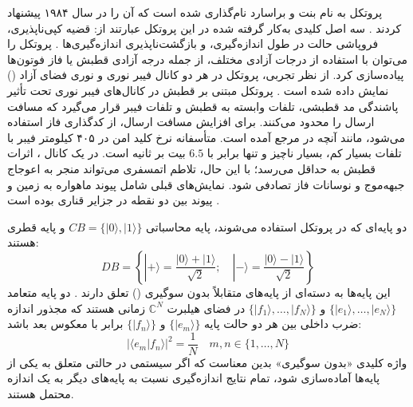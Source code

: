 پروتکل  به نام بنت و براسارد نام‌گذاری شده است که آن را در سال ۱۹۸۴ پیشنهاد کردند \cite{15,16}. سه اصل کلیدی به‌کار گرفته شده در این پروتکل عبارتند از: قضیه کپی‌ناپذیری، فروپاشی حالت در طول اندازه‌گیری، و بازگشت‌ناپذیری اندازه‌گیری‌ها \cite{7}. پروتکل  را می‌توان با استفاده از درجات آزادی مختلف، از جمله درجه آزادی قطبش \cite{25} یا فاز فوتون‌ها \cite{22} پیاده‌سازی کرد. از نظر تجربی، پروتکل  در هر دو کانال فیبر نوری و نوری فضای آزاد () نمایش داده شده است \cite{25,26}. پروتکل  مبتنی بر قطبش در کانال‌های فیبر نوری تحت تأثیر پاشندگی مد قطبشی، تلفات وابسته به قطبش و تلفات فیبر قرار می‌گیرد که مسافت ارسال را محدود می‌کنند. برای افزایش مسافت ارسال، از کدگذاری فاز استفاده می‌شود، مانند آنچه در مرجع \cite{26} آمده است. متأسفانه نرخ کلید امن در ۴۰۵ کیلومتر فیبر با تلفات بسیار کم، بسیار ناچیز و تنها برابر با $6.5$ بیت بر ثانیه است. در یک کانال ، اثرات قطبش به حداقل می‌رسد؛ با این حال، تلاطم اتمسفری می‌تواند منجر به اعوجاج جبهه‌موج و نوسانات فاز تصادفی شود. نمایش‌های قبلی  شامل پیوند  ماهواره به زمین و پیوند  بین دو نقطه در جزایر قناری بوده است \cite{25}.

دو پایه‌ای که در پروتکل  استفاده می‌شوند، پایه محاسباتی $CB = \{|0\rangle, |1\rangle\}$ و پایه قطری هستند:
\begin{equation}
	DB = \left\{ |+\rangle = \frac{|0\rangle + |1\rangle}{\sqrt{2}} ; \quad |-\rangle = \frac{|0\rangle - |1\rangle}{\sqrt{2}} \right\}
	\label{eq:6-7}
\end{equation}
این پایه‌ها به دسته‌ای از پایه‌های متقابلاً بدون سوگیری () تعلق دارند \cite{27,28,29,30,31}. دو پایه متعامد $\{|e_1\rangle, \dots, |e_N\rangle\}$ و $\{|f_1\rangle, \dots, |f_N\rangle\}$ در فضای هیلبرت $\mathbb{C}^N$ زمانی  هستند که مجذور اندازه ضرب داخلی بین هر دو حالت پایه $\{|e_m\rangle\}$ و $\{|f_n\rangle\}$ برابر با معکوس بعد باشد:
\begin{equation}
	|\langle e_m | f_n \rangle|^2 = \frac{1}{N} \quad m, n \in \{1, \dots, N\}
	\label{eq:6-8}
\end{equation}
واژه کلیدی «بدون سوگیری» بدین معناست که اگر سیستمی در حالتی متعلق به یکی از پایه‌ها آماده‌سازی شود، تمام نتایج اندازه‌گیری نسبت به پایه‌های دیگر به یک اندازه محتمل هستند.

